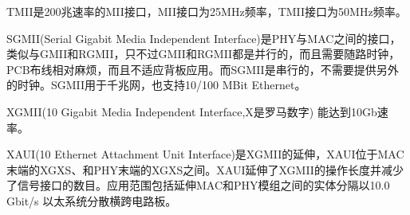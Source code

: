 TMII是200兆速率的MII接口，MII接口为25MHz频率，TMII接口为50MHz频率。

SGMII(Serial Gigabit Media Independent Interface)是PHY与MAC之间的接口，类似与GMII和RGMII，只不过GMII和RGMII都是并行的，而且需要随路时钟，PCB布线相对麻烦，而且不适应背板应用。而SGMII是串行的，不需要提供另外的时钟。SGMII用于千兆网，也支持10/100 MBit Ethernet。


XGMII(10 Gigabit Media Independent Interface,X是罗马数字) 能达到10Gb速率。

XAUI(10 Ethernet Attachment Unit Interface)是XGMII的延伸，XAUI位于MAC末端的XGXS、和PHY末端的XGXS之间。XAUI延伸了XGMII的操作长度并减少了信号接口的数目。应用范围包括延伸MAC和PHY模组之间的实体分隔以10.0 Gbit/s 以太系统分散横跨电路板。




























